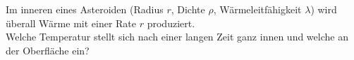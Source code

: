 \begin{Exercise}[label = Asteroidentemperatur, origin =Auswahlwettbewerb zur IPHO, title = Asteroidentemperatur ,difficulty = 3]
Im inneren eines Asteroiden (Radius $r$, Dichte $\rho$, Wärmeleitfähigkeit $\lambda$) wird überall Wärme mit einer Rate $r$ produziert.\\
Welche Temperatur stellt sich nach einer langen Zeit ganz innen und welche an der Oberfläche ein?   	
\end{Exercise}
